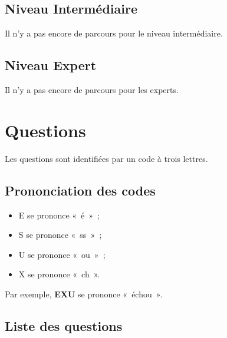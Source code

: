 \documentclass[11pt]{article}
\newcommand{\QST}[1]
{\textbf{#1}}
\begin{document}
\subsection{Niveau Intermédiaire}

Il n’y a pas encore de parcours pour le niveau intermédiaire.

\subsection{Niveau Expert}

Il n’y a pas encore de parcours pour les experts.

\section{Questions}

Les questions sont identifiées par un code à trois lettres.

\subsection{Prononciation des codes}

\begin{itemize}
    \item E se prononce « é » ;
    \item S se prononce « ss » ;
    \item U se prononce « ou » ;
    \item X se prononce « ch ».
\end{itemize}

Par exemple, \QST{EXU} se prononce « échou ».

\subsection{Liste des questions} \label{liste questions}
\end{document}
